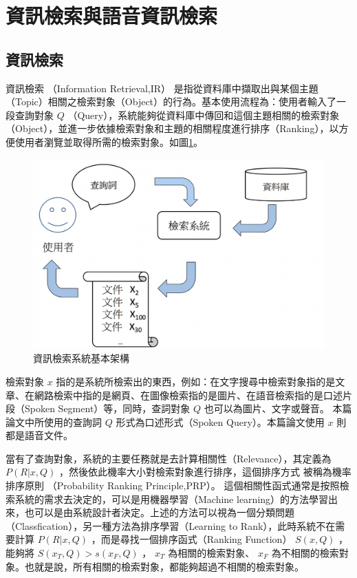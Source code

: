 \section{資訊檢索與語音資訊檢索}

\subsection{資訊檢索}


資訊檢索 （Information Retrieval,IR）
是指從資料庫中擷取出與某個主題（Topic）相關之檢索對象（Object）的行為。基本使用流程為：使用者輸入了一段查詢對象 $ Q $ （Query），系統能夠從資料庫中傳回和這個主題相關的檢索對象（Object），並進一步依據檢索對象和主題的相關程度進行排序（Ranking），以方便使用者瀏覽並取得所需的檢索對象。如圖\ref{fig:ch2_IR}。
\begin{figure}
\centering
\includegraphics[scale=0.4]{images/ch2_Ir.png}
\caption{資訊檢索系統基本架構} \label{fig:ch2_IR}
\end{figure}

檢索對象  $ x $ 
指的是系統所檢索出的東西，例如：在文字搜尋中檢索對象指的是文章、在網路檢索中指的是網頁、在圖像檢索指的是圖片、在語音檢索指的是口述片段（Spoken Segment）等，同時，查詞對象  $ Q $  也可以為圖片、文字或聲音。
本篇論文中所使用的查詢詞  $ Q $  形式為口述形式（Spoken Query）。本篇論文使用  $ x $  則都是語音文件。

當有了查詢對象，系統的主要任務就是去計算相關性（Relevance），其定義為  $ P(R|x,Q) $  ，然後依此機率大小對檢索對象進行排序，這個排序方式
被稱為機率排序原則 （Probability Ranking Principle,PRP）\cite{robertson1997probability}。
這個相關性函式通常是按照檢索系統的需求去決定的，可以是用機器學習（Machine
learning）的方法學習出來，也可以是由系統設計者決定。上述的方法可以視為一個分類問題（Classfication），另一種方法為排序學習（Learning
to Rank），此時系統不在需要計算  $ P(R|x,Q) $ ，而是尋找一個排序函式（Ranking Function）
 $ S(x,Q) $ ，能夠將 $  S(x_T,Q)>s(x_F,Q) $ ，  $ x_T $  為相關的檢索對象、  $ x_F $ 
為不相關的檢索對象。也就是說，所有相關的檢索對象，都能夠超過不相關的檢索對象。


